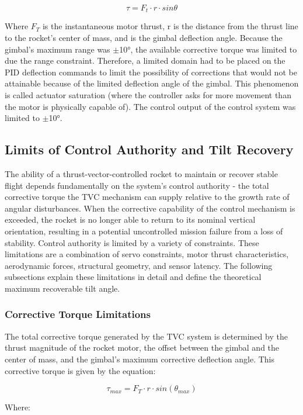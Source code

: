 \[\tau = F_{t} \cdot r \cdot sin\theta\]

Where $F_{T}$ is the instantaneous motor thrust, r is the distance from the thrust line to the rocket’s center of mass, and  is the gimbal deflection angle. Because the gimbal’s maximum range was $\pm$10°, the available corrective torque was limited to due the range constraint. Therefore, a limited domain had to be placed on the PID deflection commands to limit the possibility of corrections that would not be attainable because of the limited deflection angle of the gimbal. This phenomenon is called actuator saturation (where the controller asks for more movement than the motor is physically capable of). The control output of the control system was limited to $\pm$10°. 


\subsection{Limits of Control Authority and Tilt Recovery}

The ability of a thrust-vector-controlled rocket to maintain or recover stable flight depends fundamentally on the system’s control authority - the total corrective torque the TVC mechanism can supply relative to the growth rate of angular disturbances. When the corrective capability of the control mechanism is exceeded, the rocket is no longer able to return to its nominal vertical orientation, resulting in a potential uncontrolled mission failure from a loss of stability.
Control authority is limited by a variety of constraints. These limitations are a combination of servo constraints, motor thrust characteristics, aerodynamic forces, structural geometry, and sensor latency. The following subsections explain these limitations in detail and define the theoretical maximum recoverable tilt angle. 

\subsubsection{Corrective Torque Limitations}
The total corrective torque generated by the TVC system is determined by the thrust magnitude of the rocket motor, the offset between the gimbal and the center of mass, and the gimbal’s maximum corrective deflection angle. This corrective torque is given by the equation:

\[\tau_{max} = F_{T} \cdot r \cdot sin(\theta_{max})\]

Where:

